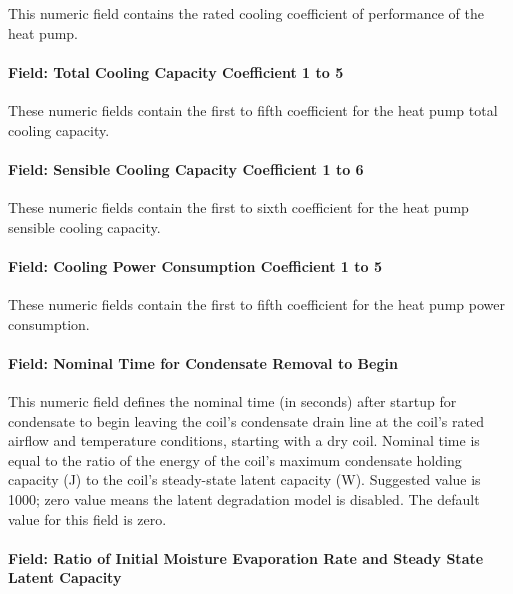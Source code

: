 This numeric field contains the rated cooling coefficient of performance of the heat pump.

\paragraph{Field: Total Cooling Capacity Coefficient 1 to 5}\label{field-total-cooling-capacity-coefficient-1-to-5}

These numeric fields contain the first to fifth coefficient for the heat pump total cooling capacity.

\paragraph{Field: Sensible Cooling Capacity Coefficient 1 to 6}\label{field-sensible-cooling-capacity-coefficient-1-to-6}

These numeric fields contain the first to sixth coefficient for the heat pump sensible cooling capacity.

\paragraph{Field: Cooling Power Consumption Coefficient 1 to 5}\label{field-cooling-power-consumption-coefficient-1-to-5}

These numeric fields contain the first to fifth coefficient for the heat pump power consumption.

\paragraph{Field: Nominal Time for Condensate Removal to Begin}\label{field-nominal-time-for-condensate-removal-to-begin-4}

This numeric field defines the nominal time (in seconds) after startup for condensate to begin leaving the coil's condensate drain line at the coil's rated airflow and temperature conditions, starting with a dry coil. Nominal time is equal to the ratio of the energy of the coil's maximum condensate holding capacity (J) to the coil's steady-state latent capacity (W). Suggested value is 1000; zero value means the latent degradation model is disabled. The default value for this field is zero.

\paragraph{Field: Ratio of Initial Moisture Evaporation Rate and Steady State Latent Capacity}\label{field-ratio-of-initial-moisture-evaporation-rate-and-steady-state-latent-capacity-4}

